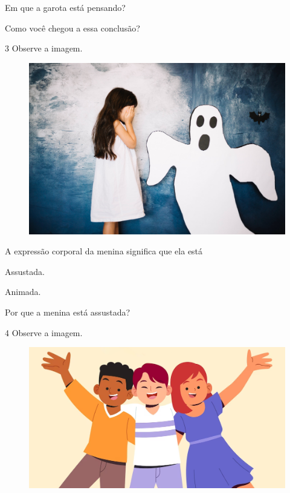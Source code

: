 \begin{escolha}
\item Em que a garota está pensando?


\item Como você chegou a essa conclusão?

\end{escolha}

\num{3} Observe a imagem.

\begin{figure}[H]
\centering
\includegraphics[width=.6\textwidth]{media/image204.jpg}
\end{figure}

\begin{escolha}
\item A expressão corporal da menina significa que ela está

\begin{boxlist}
 Assustada.

 Animada.
\end{boxlist}

\item Por que a menina está assustada?


\end{escolha}

\num{4} Observe a imagem.

\begin{figure}[H]
\centering
\includegraphics[width=.7\textwidth]{media/image203.png}
\end{figure}

